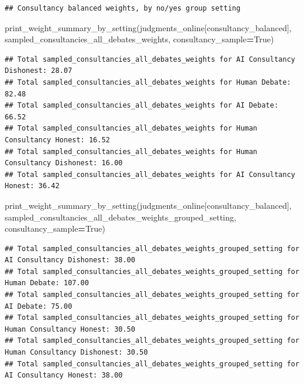 \documentclass[
]{article}
\newenvironment{Shaded}{\begin{snugshade}}{\end{snugshade}}
\newcommand{\NormalTok}[1]{#1}
\newcommand{\OperatorTok}[1]{\textcolor[rgb]{0.81,0.36,0.00}{\textbf{#1}}}
\newcommand{\StringTok}[1]{\textcolor[rgb]{0.31,0.60,0.02}{#1}}
\newcommand{\VariableTok}[1]{\textcolor[rgb]{0.00,0.00,0.00}{#1}}
\begin{document}
\begin{verbatim}
## Consultancy balanced weights, by no/yes group setting
\end{verbatim}

\begin{Shaded}
\begin{Highlighting}[]
\NormalTok{print\_weight\_summary\_by\_setting(judgments\_online[consultancy\_balanced], }\StringTok{\textquotesingle{}sampled\_consultancies\_all\_debates\_weights\textquotesingle{}}\NormalTok{, consultancy\_sample}\OperatorTok{=}\VariableTok{True}\NormalTok{)}
\end{Highlighting}
\end{Shaded}

\begin{verbatim}
## Total sampled_consultancies_all_debates_weights for AI Consultancy Dishonest: 28.07
## Total sampled_consultancies_all_debates_weights for Human Debate: 82.48
## Total sampled_consultancies_all_debates_weights for AI Debate: 66.52
## Total sampled_consultancies_all_debates_weights for Human Consultancy Honest: 16.52
## Total sampled_consultancies_all_debates_weights for Human Consultancy Dishonest: 16.00
## Total sampled_consultancies_all_debates_weights for AI Consultancy Honest: 36.42
\end{verbatim}

\begin{Shaded}
\begin{Highlighting}[]
\NormalTok{print\_weight\_summary\_by\_setting(judgments\_online[consultancy\_balanced], }\StringTok{\textquotesingle{}sampled\_consultancies\_all\_debates\_weights\_grouped\_setting\textquotesingle{}}\NormalTok{, consultancy\_sample}\OperatorTok{=}\VariableTok{True}\NormalTok{)}
\end{Highlighting}
\end{Shaded}

\begin{verbatim}
## Total sampled_consultancies_all_debates_weights_grouped_setting for AI Consultancy Dishonest: 38.00
## Total sampled_consultancies_all_debates_weights_grouped_setting for Human Debate: 107.00
## Total sampled_consultancies_all_debates_weights_grouped_setting for AI Debate: 75.00
## Total sampled_consultancies_all_debates_weights_grouped_setting for Human Consultancy Honest: 30.50
## Total sampled_consultancies_all_debates_weights_grouped_setting for Human Consultancy Dishonest: 30.50
## Total sampled_consultancies_all_debates_weights_grouped_setting for AI Consultancy Honest: 38.00
\end{verbatim}
\end{document}
